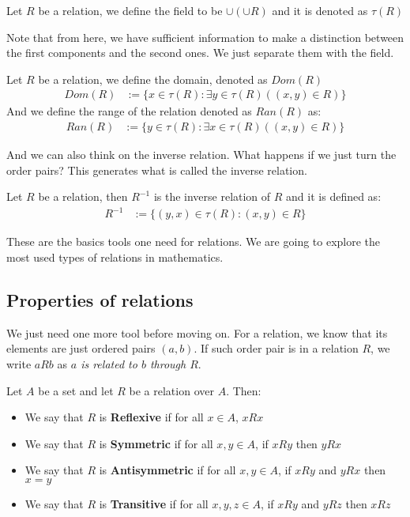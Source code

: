\documentclass{tufte-handout}
\begin{document}
\begin{definition}
	Let $R$ be a relation, we define the field to be $\cup(\cup R)$ and it is denoted as $\tau(R)$
\end{definition}

Note that from here, we have sufficient information to make a distinction between the first components and the second ones. We just separate them with the field.

\begin{definition}
	Let $R$ be a relation, we define the domain, denoted as $Dom(R)$
	\begin{align*}
		Dom(R) &:= \{x \in \tau(R): \exists y \in \tau(R)((x, y) \in R)\}
	\end{align*}
	And we define the range of the relation denoted as $Ran(R)$ as:
	\begin{align*}
		Ran(R) &:= \{y \in \tau(R): \exists x \in \tau(R)((x, y) \in R)\}
	\end{align*}
\end{definition}

And we can also think on the inverse relation. What happens if we just turn the order pairs? This generates what is called the inverse relation.

\begin{definition}
	Let $R$ be a relation, then $R^{-1}$ is the inverse relation of $R$ and it is defined as:
	\begin{align*}
		R^{-1} &:= \{(y, x) \in \tau(R): (x, y) \in R\}
	\end{align*}
\end{definition}

These are the basics tools one need for relations. We are going to explore the most used types of relations in mathematics.

\subsection{Properties of relations}
We just need one more tool before moving on. For a relation, we know that its elements are just ordered pairs $(a, b)$. If such order pair is in a relation $R$, we write $aRb$ as \textit{$a$ is related to $b$ through $R$}.

\begin{definition}
	Let $A$ be a set and let $R$ be a relation over $A$. Then:
	\begin{itemize}
		\item We say that $R$ is \textbf{Reflexive} if for all $x \in A$, $xRx$
		\item We say that $R$ is \textbf{Symmetric} if for all $x, y \in A$, if $xRy$ then $yRx$
		\item We say that $R$ is \textbf{Antisymmetric} if for all $x, y \in A$, if $xRy$ and $yRx$ then $x = y$
		\item We say that $R$ is \textbf{Transitive} if for all $x, y, z \in A$, if $xRy$ and $yRz$ then $xRz$
	\end{itemize}
\end{definition}
\end{document}
